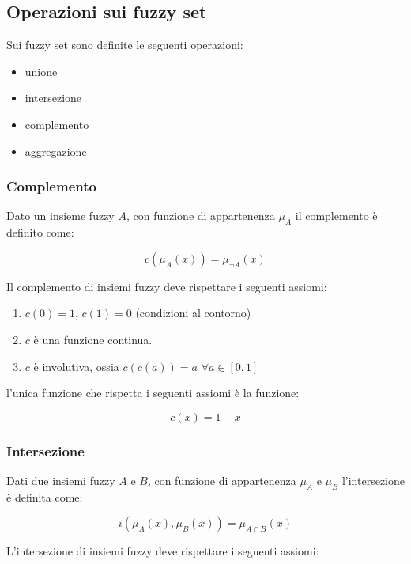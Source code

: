 \subsection{Operazioni sui fuzzy set}

Sui fuzzy set sono definite le seguenti operazioni:
\begin{itemize}
 \item unione
 \item intersezione
 \item complemento
 \item aggregazione
\end{itemize}

\subsubsection{Complemento}

Dato un insieme fuzzy $A$, con funzione di appartenenza $\mu_A$ il complemento è definito come:

\begin{equation*}
 c(\mu_A(x)) = \mu_{\neg A}(x)
\end{equation*}

Il complemento di insiemi fuzzy deve rispettare i seguenti assiomi:
\begin{enumerate}
 \item $c(0)=1$, $c(1)=0$ (condizioni al contorno)
 \item $c$ è una funzione continua.
 \item $c$ è involutiva, ossia $c(c(a))=a\, \, \forall a \in [0, 1]$
\end{enumerate}

l'unica funzione che rispetta i seguenti assiomi è la funzione:

\begin{equation*}
 c(x) = 1 - x
\end{equation*}

\subsubsection{Intersezione}

Dati due insiemi fuzzy $A$ e $B$, con funzione di appartenenza $\mu_A$ e $\mu_B$ l'intersezione  è definita come:

\begin{equation*}
 i(\mu_A(x), \mu_B(x)) = \mu_{A\cap B}(x)
\end{equation*}

L'intersezione di insiemi fuzzy deve rispettare i seguenti assiomi:

